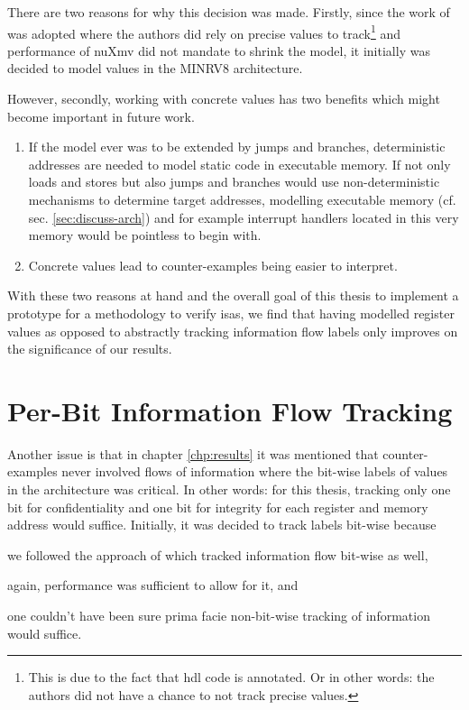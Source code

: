 There are two reasons for why this decision was made.
Firstly, since the work of \citeauthor{Ferraiuolo17} \cite{Ferraiuolo17} was adopted where the authors did rely on precise values to track\footnote{%
    This is due to the fact that \gls{hdl} code is annotated.
    Or in other words: the authors did not have a chance to not track precise values.
} and performance of nuXmv did not mandate to shrink the model, it initially was decided to model values in the MINRV8 architecture.

However, secondly, working with concrete values has two benefits which might become important in future work.
\begin{enumerate}
    \item If the model ever was to be extended by jumps and branches, deterministic addresses are needed to model static code in executable memory.
    If not only loads and stores but also jumps and branches would use non-deterministic mechanisms to determine target addresses, modelling executable memory (cf. sec. \ref{sec:discuss-arch}) and for example interrupt handlers located in this very memory would be pointless to begin with.
    \item Concrete values lead to counter-examples being easier to interpret.
\end{enumerate}

With these two reasons at hand and the overall goal of this thesis to implement a prototype for a methodology to verify \glspl{isa}, we find that having modelled register values as opposed to abstractly tracking information flow labels only improves on the significance of our results.

\section{Per-Bit Information Flow Tracking}
\label{sec:per-bit-tracking}

Another issue is that in chapter \ref{chp:results} it was mentioned that counter-examples never involved flows of information where the bit-wise labels of values in the architecture was critical.
In other words: for this thesis, tracking only one bit for confidentiality and one bit for integrity for each register and memory address would suffice.
Initially, it was decided to track labels bit-wise because \begin{enumerate*}[label=\alph*)]
    \item we followed the approach of \citeauthor{Ferraiuolo17} \cite{Ferraiuolo17} which tracked information flow bit-wise as well,
    \item again, performance was sufficient to allow for it, and
    \item one couldn't have been sure prima facie non-bit-wise tracking of information would suffice.
\end{enumerate*}

